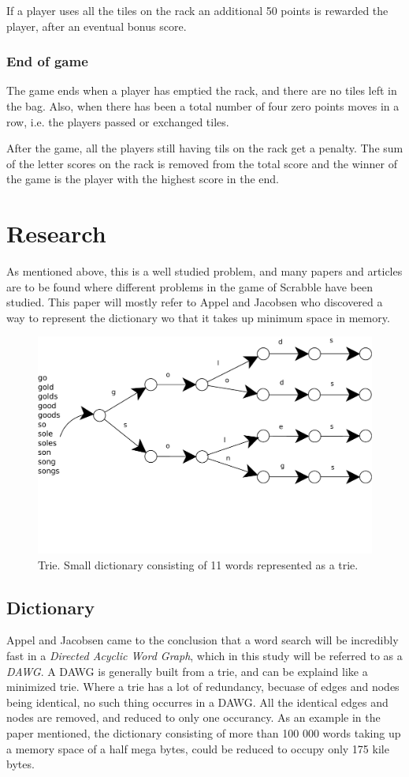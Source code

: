 \documentclass[a4paper, 12pt]{report}
\begin{document}
If a player uses all the tiles on the rack an additional 50 points is rewarded the player, after an eventual bonus score.

\subsubsection{End of game}
The game ends when a player has emptied the rack, and there are no tiles left in the bag. Also, when there has been a total number of four zero points moves in a row, i.e. the players passed or exchanged tiles.

After the game, all the players still having tils on the rack get a penalty. The sum of the letter scores on the rack is removed from the total score and the winner of the game is the player with the highest score in the end.

\section{Research}
As mentioned above, this is a well studied problem, and many papers and articles are to be found where different problems in the game of Scrabble have been studied. This paper will mostly refer to Appel and Jacobsen \cite{fastest} who discovered a way to represent the dictionary wo that it takes up minimum space in memory.
\begin{figure}[h]
\centering
\includegraphics[scale=0.5]{trie}
\caption{Trie. Small dictionary consisting of 11 words represented as a trie.}
\end{figure}
\subsection{Dictionary}
Appel and Jacobsen \cite{fastest} came to the conclusion that a word search will be incredibly fast in a \emph{Directed Acyclic Word Graph}, which in this study will be referred to as a \emph{DAWG}. A DAWG is generally built from a trie, and can be explaind like a minimized trie. Where a trie has a lot of redundancy, becuase of edges and nodes being identical, no such thing occurres in a DAWG. All the identical edges and nodes are removed, and reduced to only one occurancy. As an example in the paper mentioned, the dictionary consisting of more than 100 000 words taking up a memory space of a half mega bytes, could be reduced to occupy only 175 kile bytes.
\end{document}
